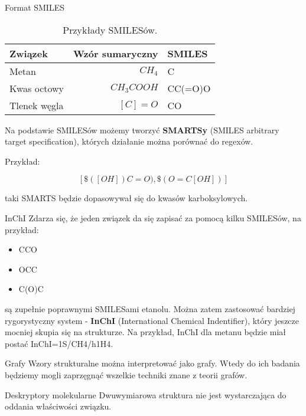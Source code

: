 \documentclass{beamer}
\begin{document}
\begin{frame}{Format SMILES}

\begin{table}[ht]
\centering
\begin{tabular}{|l|r|l|}
\hline
\rowcolor{orange!40} 
Związek & Wzór sumaryczny & SMILES\\\hline
Metan & $CH_4$ & C \\\hline
Kwas octowy & $CH_3COOH$ & CC(=O)O \\\hline
Tlenek węgla & $[C]=O$ & CO \\\hline

\end{tabular}
\caption{\label{tab:widgets}Przykłady SMILESów.}
\end{table}

Na podstawie SMILESów możemy tworzyć \textbf{SMARTSy} (SMILES arbitrary target specification), których działanie można porównać do regexów.

Przykład: 

\[
[\text{\$}([OH])C=O),\text{\$}(O=C[OH])]
\]

taki SMARTS będzie dopasowywał się do kwasów karboksylowych.

\end{frame}

\begin{frame}{InChI}
Zdarza się, że jeden związek da się zapisać za pomocą kilku SMILESów, na przykład:
\begin{itemize}
    \item CCO 
    \item OCC
    \item C(O)C
\end{itemize}
są zupełnie poprawnymi SMILESami etanolu. Można zatem zastosować bardziej rygorystyczny system - \textbf{InChI} (International Chemical Indentifier), który jeszcze mocniej skupia się na strukturze. Na przykład, InChI dla metanu będzie miał postać InChI=1S/CH4/h1H4.

\end{frame}

\begin{frame}{Grafy}
Wzory strukturalne można interpretować jako grafy. Wtedy do ich badania będziemy mogli zaprzęgnąć wszelkie techniki znane z teorii grafów. 
\end{frame}

\begin{frame}{Deskryptory molekularne}
Dwuwymiarowa struktura nie jest wystarczająca do oddania właściwości związku.
\end{frame}
\end{document}
